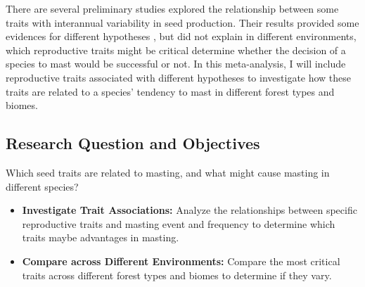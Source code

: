 \documentclass[11pt,letter]{article}
\begin{document}
There are several preliminary studies explored the relationship between some traits with interannual variability in seed production. Their results provided some evidences for different hypotheses \citep{journe2023evolution, fernandez2019nutrient, pearse2020biogeography}, but did not explain in different environments, which reproductive traits might be critical determine whether the decision of a species to mast would be successful or not. In this meta-analysis, I will include reproductive traits associated with different hypotheses to investigate how these traits are related to a species' tendency to mast in different forest types and biomes.\par

\subsection{Research Question and Objectives}
Which seed traits are related to masting, and what might cause masting in different species?
	\begin{itemize}
	\item \textbf{Investigate Trait Associations:} Analyze the relationships between specific reproductive traits and masting event and frequency to determine which traits maybe advantages in masting.
	\item \textbf{Compare across Different Environments:} Compare the most critical traits across different forest types and biomes to determine if they vary.
	\end{itemize}
\end{document}
